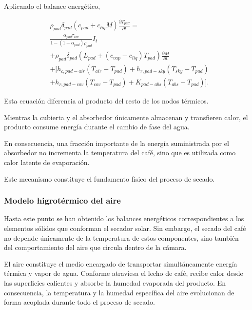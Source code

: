 Aplicando el balance energético,

\begin{equation}
\boxed{
\begin{aligned}
&
\rho_{pad}\delta_{pad}
(c_{pad}+c_{liq}M)
\frac{\partial T_{pad}}{\partial t}
=
\\
&
\frac{\alpha_{pad}\tau_{cov}}
{1-(1-\alpha_{pad})\rho_{pad}}
I_t
\\
&
+
\rho_{pad}\delta_{pad}
\left(
L_{pad}
+
(c_{vap}-c_{liq})T_{pad}
\right)
\frac{\partial M}{\partial t}
\\
&
+
\Big[
h_{c,pad-air}(T_{air}-T_{pad})
+
h_{r,pad-sky}(T_{sky}-T_{pad})
\\
&
+
h_{r,pad-cov}(T_{cov}-T_{pad})
+
K_{pad-abs}(T_{abs}-T_{pad})
\Big].
\end{aligned}
}
\end{equation}

\begin{tcolorbox}[title=Aspecto clave del modelo,colback=yellow!6,colframe=orange!70!black]

Esta ecuación diferencia al producto del resto de los nodos térmicos.

Mientras la cubierta y el absorbedor únicamente almacenan y transfieren calor, el producto consume energía durante el cambio de fase del agua.

En consecuencia, una fracción importante de la energía suministrada por el absorbedor no incrementa la temperatura del café, sino que es utilizada como calor latente de evaporación.

Este mecanismo constituye el fundamento físico del proceso de secado.

\end{tcolorbox}




\subsubsection{Modelo higrotérmico del aire}

Hasta este punto se han obtenido los balances energéticos correspondientes a los elementos sólidos que conforman el secador solar. Sin embargo, el secado del café no depende únicamente de la temperatura de estos componentes, sino también del comportamiento del aire que circula dentro de la cámara.

El aire constituye el medio encargado de transportar simultáneamente energía térmica y vapor de agua. Conforme atraviesa el lecho de café, recibe calor desde las superficies calientes y absorbe la humedad evaporada del producto. En consecuencia, la temperatura y la humedad específica del aire evolucionan de forma acoplada durante todo el proceso de secado.

